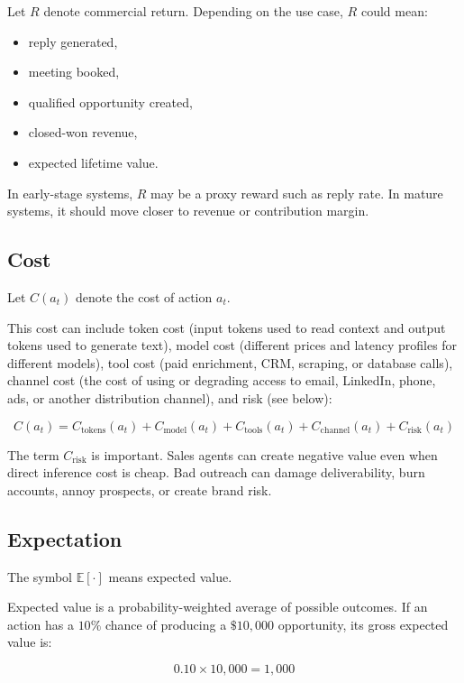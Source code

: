 \documentclass[12pt]{article}
\begin{document}
Let \(R\) denote commercial return. Depending on the use case, \(R\) could mean:

\begin{itemize}
    \item reply generated,
    \item meeting booked,
    \item qualified opportunity created,
    \item closed-won revenue,
    \item expected lifetime value.
\end{itemize}

In early-stage systems, \(R\) may be a proxy reward such as reply rate. In mature
systems, it should move closer to revenue or contribution margin.

\subsection{Cost}

Let \(C(a_t)\) denote the cost of action \(a_t\).

This cost can include token cost (input tokens used to read context and output
tokens used to generate text), model cost (different prices and latency profiles
for different models), tool cost (paid enrichment, CRM, scraping, or database
calls), channel cost (the cost of using or degrading access to email, LinkedIn,
phone, ads, or another distribution channel), and risk (see below):

\[
C(a_t)
=
C_{\text{tokens}}(a_t)
+
C_{\text{model}}(a_t)
+
C_{\text{tools}}(a_t)
+
C_{\text{channel}}(a_t)
+
C_{\text{risk}}(a_t)
\]

The term \(C_{\text{risk}}\) is important. Sales agents can create negative value
even when direct inference cost is cheap. Bad outreach can damage deliverability,
burn accounts, annoy prospects, or create brand risk.

\subsection{Expectation}

The symbol \(\mathbb{E}[\cdot]\) means expected value.

Expected value is a probability-weighted average of possible outcomes. If an
action has a \(10\%\) chance of producing a \(\$10{,}000\) opportunity, its gross
expected value is:

\[
0.10 \times 10{,}000 = 1{,}000
\]
\end{document}
